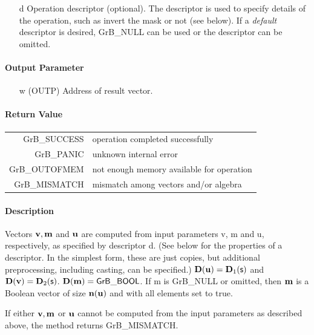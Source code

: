 \documentclass[11pt]{extarticle}
\begin{document}
{\begin{itemize}
	\item[{\sf d}] Operation descriptor (optional). The descriptor
	is used to specify details of the operation, such as 
	invert the mask or not (see below). If a
	\emph{default} descriptor is desired, {\sf GrB\_NULL} can be
	used or the descriptor can be omitted.
\end{itemize}

\paragraph{Output Parameter}

\begin{itemize}
	\item[{\sf w}] ({\sf OUTP}) Address of result vector.
\end{itemize}

\paragraph{Return Value}

\begin{tabular}{rl} 
{\sf GrB\_SUCCESS} 	& operation completed successfully \\
{\sf GrB\_PANIC}	& unknown internal error \\
{\sf GrB\_OUTOFMEM}	& not enough memory available for operation \\
{\sf GrB\_MISMATCH}	& mismatch among vectors and/or algebra
\end{tabular}

\paragraph{Description}

Vectors ${\bf v}, {\bf m}$ and ${\bf u}$ are computed from
input parameters {\sf v}, {\sf m} and {\sf u}, respectively, as specified
by descriptor {\sf d}. (See below for the properties of a descriptor. In
the simplest form, these are just copies, but additional preprocessing,
including casting, can be specified.)  $\bold{D}({\bf u}) =
\bold{D}_1({\sf s})$ and $\bold{D}({\bf v}) = \bold{D}_2({\sf s})$.
$\bold{D}({\bf m}) = {\sf GrB\_BOOL}$.  If {\sf m} is {\sf GrB\_NULL} or omitted,
then ${\bf m}$ is a Boolean vector of size $\bold{n}({\bf u})$
and with all elements set to {\sf true}.

If either ${\bf v}, {\bf m}$ or ${\bf u}$ cannot be computed
from the input parameters as described above, the method returns {\sf
GrB\_MISMATCH}.

}
\end{document}
